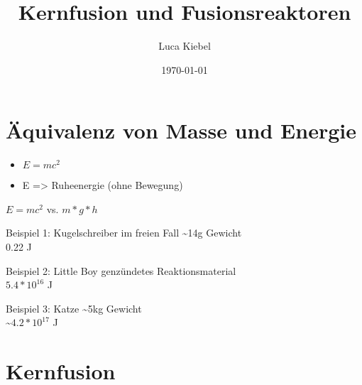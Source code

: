 \documentclass[10pt,a4paper, ngerman]{beamer}
\author{Luca Kiebel}
\title{Kernfusion und Fusionsreaktoren}
\date{\today}
\institute[HBBK]{Hans-Böckler-Berufskolleg}
\begin{document}
\begin{frame}
\titlepage
\end{frame}

\section[Energie aus Masse]{Äquivalenz von Masse und Energie}
\begin{frame}{\secname}{\subsecname}
\begin{itemize}[<+->]
\item \(E=mc^2\)
\item E => Ruheenergie (ohne Bewegung)
\end{itemize}
\end{frame}

\begin{frame}{\secname}{\(E=mc^2\) vs. \(m*g*h\)}
\begin{exampleblock}{Beispiel 1: Kugelschreiber im freien Fall}
	\textasciitilde14g Gewicht \\
	0.22 J
\end{exampleblock}
\pause
\begin{exampleblock}{Beispiel 2: Little Boy} %
	 genzündetes Reaktionsmaterial \\
	\(5.4*10^{16}\) J 
\end{exampleblock}
\pause[4]
\begin{exampleblock}{Beispiel 3: Katze}
	\textasciitilde5kg Gewicht \\
	\textasciitilde\(4.2*10^{17}\) J
\end{exampleblock}
\end{frame}


\section{Kernfusion}
\end{document}

